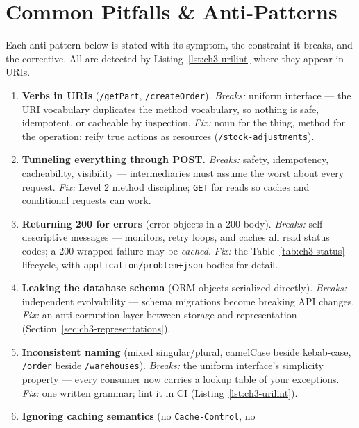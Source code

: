 \section{Common Pitfalls \& Anti-Patterns}
\label{sec:ch3-pitfalls}

Each anti-pattern below is stated with its symptom, the constraint it breaks,
and the corrective. All are detected by Listing~\ref{lst:ch3-urilint} where they
appear in URIs.

\begin{enumerate}
  \item \textbf{Verbs in URIs} (\texttt{/getPart}, \texttt{/createOrder}).
        \emph{Breaks:} uniform interface --- the URI vocabulary duplicates the
        method vocabulary, so nothing is safe, idempotent, or cacheable by
        inspection. \emph{Fix:} noun for the thing, method for the operation;
        reify true actions as resources (\texttt{/stock-adjustments}).
  \item \textbf{Tunneling everything through POST.} \emph{Breaks:} safety,
        idempotency, cacheability, visibility --- intermediaries must assume
        the worst about every request. \emph{Fix:} Level 2 method discipline;
        \texttt{GET} for reads so caches and conditional requests can work.
  \item \textbf{Returning 200 for errors} (error objects in a 200 body).
        \emph{Breaks:} self-descriptive messages --- monitors, retry loops, and
        caches all read status codes; a 200-wrapped failure may be
        \emph{cached}. \emph{Fix:} the Table~\ref{tab:ch3-status} lifecycle,
        with \texttt{application/problem+json} bodies for detail.
  \item \textbf{Leaking the database schema} (ORM objects serialized directly).
        \emph{Breaks:} independent evolvability --- schema migrations become
        breaking API changes. \emph{Fix:} an anti-corruption layer between
        storage and representation (Section~\ref{sec:ch3-representations}).
  \item \textbf{Inconsistent naming} (mixed singular/plural, camelCase beside
        kebab-case, \texttt{/order} beside \texttt{/warehouses}).
        \emph{Breaks:} the uniform interface's simplicity property --- every
        consumer now carries a lookup table of your exceptions. \emph{Fix:} one
        written grammar; lint it in CI (Listing~\ref{lst:ch3-urilint}).
  \item \textbf{Ignoring caching semantics} (no \texttt{Cache-Control}, no

\end{enumerate}
